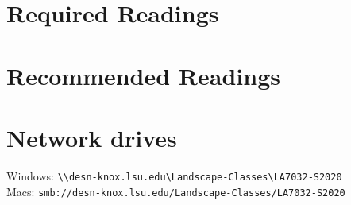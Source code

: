 \documentclass[11pt,article,oneside]{memoir}
\begin{document}
\section{Required Readings}
\vspace*{0.5cm}
\nocite{*}
\setlength{}
\printbibliography[keyword=required, heading=none]

\section{Recommended Readings}
\vspace*{0.5cm}
\nocite{*}
\setlength{}
\printbibliography[keyword=recommended, heading=none]

\section{Network drives}

\noindent
Windows: \verb|\\desn-knox.lsu.edu\Landscape-Classes\LA7032-S2020| \\

\noindent
Macs: \verb|smb://desn-knox.lsu.edu/Landscape-Classes/LA7032-S2020| \\

\clearpage

\end{document}

